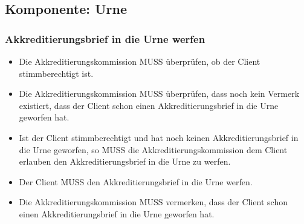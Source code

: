 \documentclass[a4paper,10pt]{article}
\begin{document}
\subsection{Komponente: Urne}
\subsubsection{Akkreditierungsbrief in die Urne werfen} \label{sec:urne_einwerfen}
\begin{itemize}
 \item Die Akkreditierungskommission MUSS überprüfen, ob der Client stimmberechtigt ist.
 \item Die Akkreditierungskommission MUSS überprüfen, dass noch kein Vermerk existiert, dass der Client schon einen Akkreditierungsbrief in die Urne geworfen hat.
 \item Ist der Client stimmberechtigt und hat noch keinen Akkreditierungsbrief in die Urne geworfen, so MUSS die Akkreditierungskommission dem Client erlauben den Akkreditierungsbrief in die Urne zu werfen.
 \item Der Client MUSS den Akkreditierungsbrief in die Urne werfen.
 \item Die Akkreditierungskommission MUSS vermerken, dass der Client schon einen Akkreditierungsbrief in die Urne geworfen hat.
\end{itemize}
\end{document}
